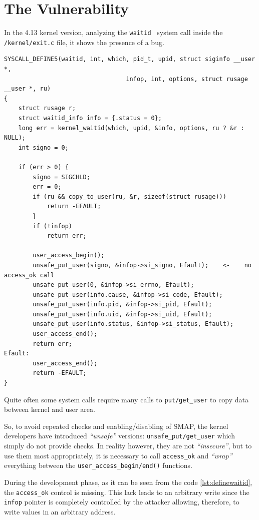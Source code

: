 \documentclass{masterthesis}
\begin{document}
\section{The Vulnerability}
\label{sect:vulnerability_17}
In the 4.13 kernel version, analyzing the \texttt{waitid}~\cite{waitid} system call inside the \texttt{/kernel/exit.c} file, it shows the presence of a bug.
\begin{lstlisting}[caption={waitid define},label={lst:definewaitid}]
SYSCALL_DEFINE5(waitid, int, which, pid_t, upid, struct siginfo __user *,
                                  infop, int, options, struct rusage __user *, ru)
{
    struct rusage r;
    struct waitid_info info = {.status = 0};
    long err = kernel_waitid(which, upid, &info, options, ru ? &r : NULL);
    int signo = 0;

    if (err > 0) {
        signo = SIGCHLD;
        err = 0;
        if (ru && copy_to_user(ru, &r, sizeof(struct rusage)))
            return -EFAULT;
        }
        if (!infop)
            return err;

        user_access_begin();
        unsafe_put_user(signo, &infop->si_signo, Efault);    <-    no access_ok call
        unsafe_put_user(0, &infop->si_errno, Efault);
        unsafe_put_user(info.cause, &infop->si_code, Efault);
        unsafe_put_user(info.pid, &infop->si_pid, Efault);
        unsafe_put_user(info.uid, &infop->si_uid, Efault);
        unsafe_put_user(info.status, &infop->si_status, Efault);
        user_access_end();
        return err;
Efault:
        user_access_end();
        return -EFAULT;
}
\end{lstlisting}
Quite often some system calls require many calls to \texttt{put/get_user} to copy data between kernel and user area.

So, to avoid repeated checks and enabling/disabling of SMAP, the kernel developers have introduced \emph{``unsafe''} versions: \texttt{unsafe_put/get_user} which simply do not provide checks.
In reality however, they are not \emph{``insecure''}, but to use them most appropriately, it is necessary to call \texttt{access\_ok} and \emph{``wrap''} everything between the \texttt{user\_access\_begin/end()} functions.


During the development phase, as it can be seen from the code \ref{lst:definewaitid}, the \texttt{access_ok} control is missing.
This lack leads to an arbitrary write since the \texttt{infop} pointer is completely controlled by the attacker allowing, therefore, to write values in an arbitrary address.
\end{document}
